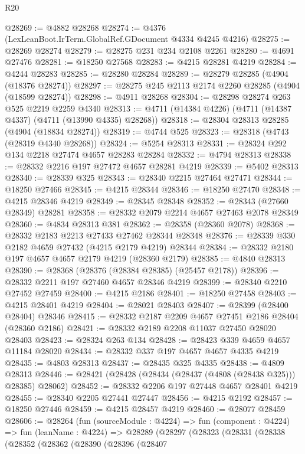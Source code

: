\begin{lexlean}{R20}
\begin{coremodule}
@28269 := @4882 @28268
@28274 := @4376 (LexLeanBoot.IrTerm.GlobalRef.GDocument @4334 @4245 @4216)
@28275 := @28269 @28274
@28279 := @28275 @231 @234 @2108 @2261
@28280 := @4691 @27476
@28281 := @18250 @27568
@28283 := @4215 @28281 @4219
@28284 := @4244 @28283
@28285 := @28280 @28284
@28289 := @28279 @28285 (@4904 (@18376 @28274))
@28297 := @28275 @245 @2113 @2174 @2260 @28285 (@4904 (@18599 @28274))
@28298 := @4911 @28268
@28304 := @28298 @28274 @263 @525 @2219 @2259 @4340
@28313 := @4711 (@14384 @4226) (@4711 (@14387 @4337) (@4711 (@13990 @4335) @28268))
@28318 := @28304 @28313 @28285 (@4904 (@18834 @28274))
@28319 := @4744 @525
@28323 := @28318 (@4743 (@28319 @4340 @28268))
@28324 := @5254 @28313
@28331 := @28324 @292 @134 @2218 @27474 @4657 @28283 @28284
@28332 := @4794 @28313
@28338 := @28332 @2216 @197 @27472 @4657 @28281 @4219
@28339 := @5402 @28313
@28340 := @28339 @325
@28343 := @28340 @2215 @27464 @27471
@28344 := @18250 @27466
@28345 := @4215 @28344
@28346 := @18250 @27470
@28348 := @4215 @28346 @4219
@28349 := @28345 @28348
@28352 := @28343 (@27660 @28349) @28281
@28358 := @28332 @2079 @2214 @4657 @27463 @2078 @28349
@28360 := @4834 @28313 @381
@28362 := @28358 (@28360 @2078)
@28368 := @28332 @2183 @2213 @27433 @27462 @28344 @28348
@28376 := @28339 @330 @2182 @4659 @27432 (@4215 @2179 @4219) @28344
@28384 := @28332 @2180 @197 @4657 @4657 @2179 @4219 (@28360 @2179)
@28385 := @4840 @28313
@28390 := @28368 (@28376 (@28384 @28385) (@25457 @2178))
@28396 := @28332 @2211 @197 @27460 @4657 @28346 @4219
@28399 := @28340 @2210 @27452 @27459
@28400 := @4215 @2186
@28401 := @18250 @27458
@28403 := @4215 @28401 @4219
@28404 := @28021 @28403
@28407 := @28399 (@28400 @28404) @28346
@28415 := @28332 @2187 @2209 @4657 @27451 @2186 @28404 (@28360 @2186)
@28421 := @28332 @2189 @2208 @11037 @27450 @28020 @28403
@28423 := @28324 @263 @134
@28428 := @28423 @339 @4659 @4657 @11184 @28020
@28434 := @28332 @337 @197 @4657 @4657 @4335 @4219
@28435 := @4803 @28313
@28437 := @28435 @325 @4335
@28438 := @4809 @28313
@28446 := @28421 (@28428 (@28434 (@28437 (@4808 (@28438 @325))) @28385) @28062)
@28452 := @28332 @2206 @197 @27448 @4657 @28401 @4219
@28455 := @28340 @2205 @27441 @27447
@28456 := @4215 @2192
@28457 := @18250 @27446
@28459 := @4215 @28457 @4219
@28460 := @28077 @28459
@28606 := @28264
    (fun (sourceModule : @4224) =>
    fun (component : @4224) =>
    fun (leanName : @4224) =>
    @28289
      (@28297
        (@28323
          (@28331
            (@28338
              (@28352
                (@28362
                  (@28390
                    (@28396
                      (@28407

\end{coremodule}
\end{lexlean}

